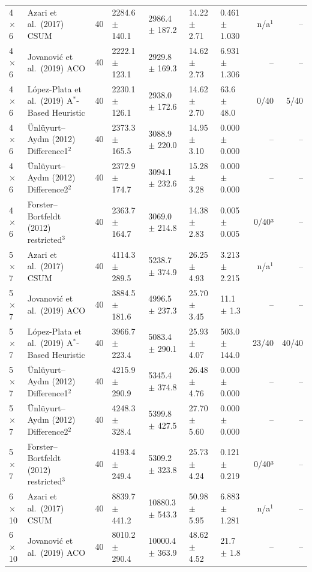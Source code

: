 \begin{table}[htbp]
\begin{tabular}{llrllllrr}
\midrule
4$\times$6 & Azari et al.\ (2017) CSUM & 40 & 2284.6 $\pm$ 140.1 & 2986.4 $\pm$ 187.2 & 14.22 $\pm$ 2.71 & 0.461 $\pm$ 1.030 & n/a$^{1}$ & -- \\
4$\times$6 & Jovanovi\'{c} et al.\ (2019) ACO & 40 & 2222.1 $\pm$ 123.1 & 2929.8 $\pm$ 169.3 & 14.62 $\pm$ 2.73 & 6.931 $\pm$ 1.306 & -- & -- \\
4$\times$6 & L\'{o}pez-Plata et al.\ (2019) A$^\ast$-Based Heuristic & 40 & 2230.1 $\pm$ 126.1 & 2938.0 $\pm$ 172.6 & 14.62 $\pm$ 2.70 & 63.6 $\pm$ 48.0 & 0/40 & 5/40 \\
4$\times$6 & \"{U}nl\"{u}yurt--Ayd\i{}n (2012) Difference1$^{2}$ & 40 & 2373.3 $\pm$ 165.5 & 3088.9 $\pm$ 220.0 & 14.95 $\pm$ 3.10 & 0.000 $\pm$ 0.000 & -- & -- \\
4$\times$6 & \"{U}nl\"{u}yurt--Ayd\i{}n (2012) Difference2$^{2}$ & 40 & 2372.9 $\pm$ 174.7 & 3094.1 $\pm$ 232.6 & 15.28 $\pm$ 3.28 & 0.000 $\pm$ 0.000 & -- & -- \\
4$\times$6 & Forster--Bortfeldt (2012) restricted$^{3}$ & 40 & 2363.7 $\pm$ 164.7 & 3069.0 $\pm$ 214.8 & 14.38 $\pm$ 2.83 & 0.005 $\pm$ 0.005 & 0/40³ & -- \\
\midrule
5$\times$7 & Azari et al.\ (2017) CSUM & 40 & 4114.3 $\pm$ 289.5 & 5238.7 $\pm$ 374.9 & 26.25 $\pm$ 4.93 & 3.213 $\pm$ 2.215 & n/a$^{1}$ & -- \\
5$\times$7 & Jovanovi\'{c} et al.\ (2019) ACO & 40 & 3884.5 $\pm$ 181.6 & 4996.5 $\pm$ 237.3 & 25.70 $\pm$ 3.45 & 11.1 $\pm$ 1.3 & -- & -- \\
5$\times$7 & L\'{o}pez-Plata et al.\ (2019) A$^\ast$-Based Heuristic & 40 & 3966.7 $\pm$ 223.4 & 5083.4 $\pm$ 290.1 & 25.93 $\pm$ 4.07 & 503.0 $\pm$ 144.0 & 23/40 & 40/40 \\
5$\times$7 & \"{U}nl\"{u}yurt--Ayd\i{}n (2012) Difference1$^{2}$ & 40 & 4215.9 $\pm$ 290.9 & 5345.4 $\pm$ 374.8 & 26.48 $\pm$ 4.76 & 0.000 $\pm$ 0.000 & -- & -- \\
5$\times$7 & \"{U}nl\"{u}yurt--Ayd\i{}n (2012) Difference2$^{2}$ & 40 & 4248.3 $\pm$ 328.4 & 5399.8 $\pm$ 427.5 & 27.70 $\pm$ 5.60 & 0.000 $\pm$ 0.000 & -- & -- \\
5$\times$7 & Forster--Bortfeldt (2012) restricted$^{3}$ & 40 & 4193.4 $\pm$ 249.4 & 5309.2 $\pm$ 323.8 & 25.73 $\pm$ 4.24 & 0.121 $\pm$ 0.219 & 0/40³ & -- \\
\midrule
6$\times$10 & Azari et al.\ (2017) CSUM & 40 & 8839.7 $\pm$ 441.2 & 10880.3 $\pm$ 543.3 & 50.98 $\pm$ 5.95 & 6.883 $\pm$ 1.281 & n/a$^{1}$ & -- \\
6$\times$10 & Jovanovi\'{c} et al.\ (2019) ACO & 40 & 8010.2 $\pm$ 290.4 & 10000.4 $\pm$ 363.9 & 48.62 $\pm$ 4.52 & 21.7 $\pm$ 1.8 & -- & -- \\

\end{tabular}
\end{table}
